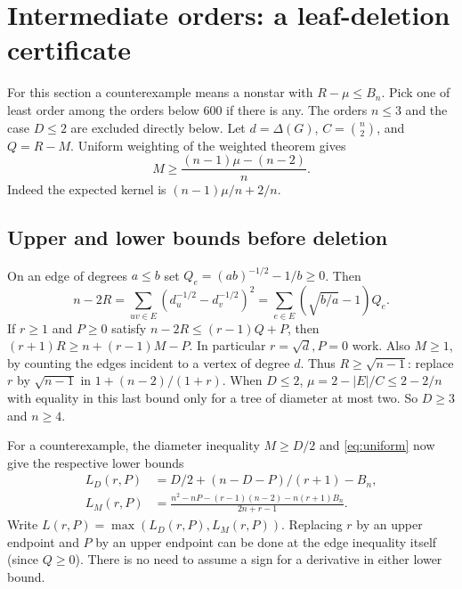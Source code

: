 \section{Intermediate orders: a leaf-deletion certificate}
\label{sec:joint}
For this section a counterexample means a nonstar with $R-\mu\le B_n$.
Pick one of least order among the orders below $600$ if there is any.
The orders $n\le3$ and the case $D\le2$ are excluded directly below.
Let $d=\Delta(G)$, $C=\binom n2$, and $Q=R-M$. Uniform weighting
of the weighted theorem gives
\begin{equation}\label{eq:uniform}
M\ge \frac{(n-1)\mu-(n-2)}n.
\end{equation}
Indeed the expected kernel is $(n-1)\mu/n+2/n$.

\subsection{Upper and lower bounds before deletion}
On an edge of degrees $a\le b$ set $Q_e=(ab)^{-1/2}-1/b\ge0$.
Then
\[
 n-2R=\sum_{uv\in E}(d_u^{-1/2}-d_v^{-1/2})^2
 =\sum_{e\in E}(\sqrt{b/a}-1)Q_e .
\]
If $r\ge1$ and $P\ge0$ satisfy $n-2R\le(r-1)Q+P$, then
$(r+1)R\ge n+(r-1)M-P$.
In particular $r=\sqrt d,P=0$ work. Also $M\ge1$, by counting
the edges incident to a vertex of degree $d$. Thus $R\ge\sqrt{n-1}$:
replace $r$ by $\sqrt{n-1}$ in $1+(n-2)/(1+r)$.
When $D\le2$, $\mu=2-|E|/C\le2-2/n$ with equality in this last
bound only for a tree of diameter at most two. So $D\ge3$ and $n\ge4$.

For a counterexample, the diameter inequality $M\ge D/2$ and
\eqref{eq:uniform} now give the respective lower bounds
\begin{align}
L_D(r,P)&=D/2+(n-D-P)/(r+1)-B_n,\\
L_M(r,P)&=\frac{n^2-nP-(r-1)(n-2)-n(r+1)B_n}{2n+r-1}.
\end{align}
Write $L(r,P)=\max(L_D(r,P),L_M(r,P))$.
Replacing $r$ by an upper endpoint and $P$ by an upper endpoint
can be done at the edge inequality itself (since $Q\ge0$).
There is no need to assume a sign for a derivative in either lower bound.

